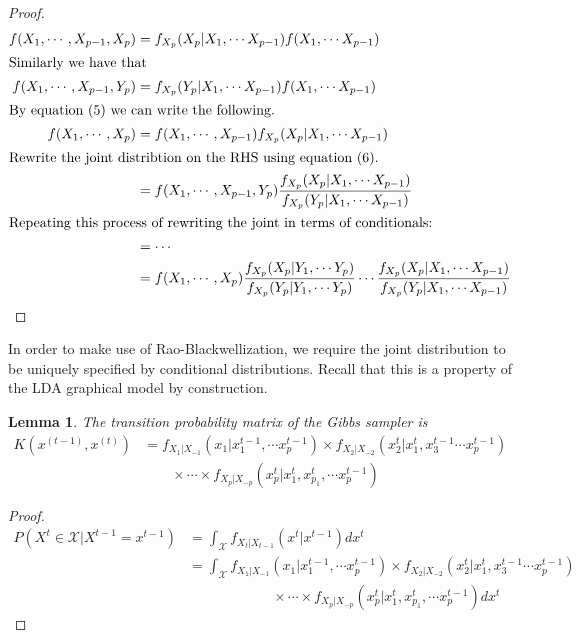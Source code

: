 \documentclass{article}%
\newtheorem{lemma}[theorem]{Lemma}
\theoremstyle{definition}
\begin{document}
\begin{proof}
\begin{align}
    f(X_1, \cdots, X_{p-1}, X_p) &= f_{X_p}(X_p | X_1, \cdots X_{p-1})f(X_1, \cdots X_{p-1}) \\
\intertext{Similarly we have that}
    f(X_1, \cdots, X_{p-1}, Y_p) &= f_{X_p}(Y_p | X_1, \cdots X_{p-1})f(X_1, \cdots X_{p-1}) \\
\intertext{By equation (5) we can write the following.}
    f(X_1,\cdots, X_p) &= f(X_1,\cdots, X_{p-1}) f_{X_p}(X_p | X_1, \cdots X_{p-1})\\
\intertext{Rewrite the joint distribtion on the RHS using equation (6).}
    &= f(X_1,\cdots, X_{p-1}, Y_p) \frac{f_{X_p}(X_p | X_1, \cdots X_{p-1})}{f_{X_p}(Y_p | X_1, \cdots X_{p-1})}\\
\intertext{Repeating this process of rewriting the joint in terms of conditionals:}
&= \cdots \\
&= f(X_1,\cdots, X_p)\frac{f_{X_p}(X_p | Y_1, \cdots Y_p)}{f_{X_p}(Y_p | Y_1, \cdots Y_{p})} \cdots \frac{f_{X_p}(X_p | X_1, \cdots X_{p-1})}{f_{X_p}(Y_p | X_1, \cdots X_{p-1})}
\end{align}
\end{proof}
In order to make use of Rao-Blackwellization, we require the joint distribution to be uniquely specified by conditional distributions. Recall that this is a property of the LDA graphical model by construction.
\begin{lemma}
The transition probability matrix of the Gibbs sampler is 
\begin{align}
\nonumber    K(x^{(t-1)},x^{(t)}) &= f_{X_1|X_{-1}}(x_1 | x_1^{t-1}, \cdots x_{p}^{t-1}) \times f_{X_2 | X_{-2}}(x_2^t | x_1^{t}, x_3^{t-1} \cdots x_{p}^{t-1}) \\
    &\qquad \times \cdots \times f_{X_p | X_{-p} }(x_p^t | x_1^{t}, x_{p_1}^{t}, \cdots x_{p}^{t-1})
\end{align}
\end{lemma}
\begin{proof}
\begin{align}
P(X^t \in \mathcal{X} | X^{t-1} = x^{t-1}) &= \int_\mathcal{X} f_{X_t | X_{t-1}}(x^t | x^{t-1})dx^t \\
\nonumber &= \int_\mathcal{X} f_{X_1|X_{-1}}(x_1 | x_1^{t-1}, \cdots x_{p}^{t-1}) \times f_{X_2 | X_{-2}}(x_2^t | x_1^{t}, x_3^{t-1} \cdots x_{p}^{t-1}) \\
    &\qquad \qquad \qquad \times \cdots \times f_{X_p | X_{-p} }(x_p^t | x_1^{t}, x_{p_1}^{t}, \cdots x_{p}^{t-1}) dx^t
\end{align}
\end{proof}
\end{document}
